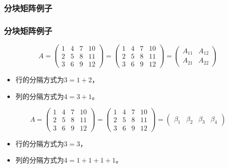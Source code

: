 \subsubsection{分块矩阵例子}
\begin{frame}\frametitle{分块矩阵例子}

\begin{equation*}
A=\left(\begin{array}{cccc}
1&4&7&10\\
2&5&8&11\\
3&6&9&12
\end{array}\right)
=
\left(\begin{array}{ccc|c}
1&4&7&10\\\hline
2&5&8&11\\
3&6&9&12
\end{array}\right)
=
\left(\begin{array}{cc}
A_{11}&A_{12}\\
A_{21}&A_{22}
\end{array}\right)
\end{equation*}
\begin{itemize}
\item 行的分隔方式为$3=1+2$，
\item 列的分隔方式为$4=3+1$。
\end{itemize}

\pp

\begin{equation*}
A=\left(\begin{array}{cccc}
1&4&7&10\\
2&5&8&11\\
3&6&9&12
\end{array}\right)
=\left(\begin{array}{c|c|c|c}
1&4&7&10\\
2&5&8&11\\
3&6&9&12
\end{array}\right)
=\left(\begin{array}{cccc}
\beta_{1}&\beta_{2}&\beta_{3}&\beta_{4}
\end{array}\right)
\end{equation*}
\begin{itemize}
\item 行的分隔方式为$3=3$，
\item 列的分隔方式为$4=1+1+1+1$。
\end{itemize}
\end{frame}






